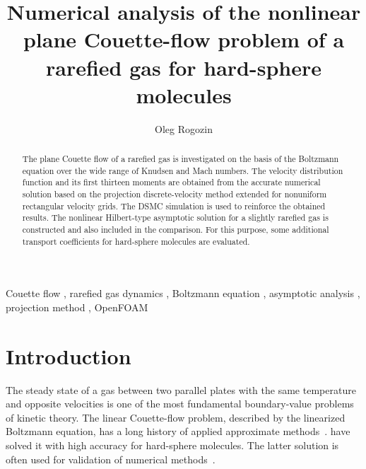 \documentclass[]{elsarticle} %
\begin{document}
\begin{frontmatter}

\title{
    Numerical analysis of the nonlinear plane Couette-flow problem of a rarefied gas for hard-sphere molecules
}

\author{Oleg Rogozin}
\address{
    Moscow Institute of Physics and Technology,
    9 Institutskiy pereulok, Dolgoprudny,
    Moskovskaya obl., Russian Federation
}

\begin{keyword}
   Couette flow \sep
   rarefied gas dynamics \sep
   Boltzmann equation \sep
   asymptotic analysis \sep
   projection method \sep
   OpenFOAM
\end{keyword}


\begin{abstract}
    The plane Couette flow of a rarefied gas is investigated on the basis of the Boltzmann equation
    over the wide range of Knudsen and Mach numbers.
    The velocity distribution function and its first thirteen moments are obtained from
    the accurate numerical solution based on the projection discrete-velocity method
    extended for nonuniform rectangular velocity grids.
    The DSMC simulation is used to reinforce the obtained results.
    The nonlinear Hilbert-type asymptotic solution for a slightly rarefied gas
    is constructed and also included in the comparison.
    For this purpose, some additional transport coefficients for hard-sphere molecules are evaluated.
\end{abstract}

\end{frontmatter}

\renewcommand*{\appendixname}{}
\tableofcontents


\section{Introduction}

The steady state of a gas between two parallel plates with the same temperature
and opposite velocities is one of the most fundamental boundary-value problems of kinetic theory.
The linear Couette-flow problem, described by the linearized Boltzmann equation,
has a long history of applied approximate methods~\citep{Willis1962}.
\citet{Ohwada1990} have solved it with high accuracy for hard-sphere molecules.
The latter solution is often used for validation of numerical methods~\citep[see e.g.][]{Fan2001,Aidun2010}.
\end{document}
